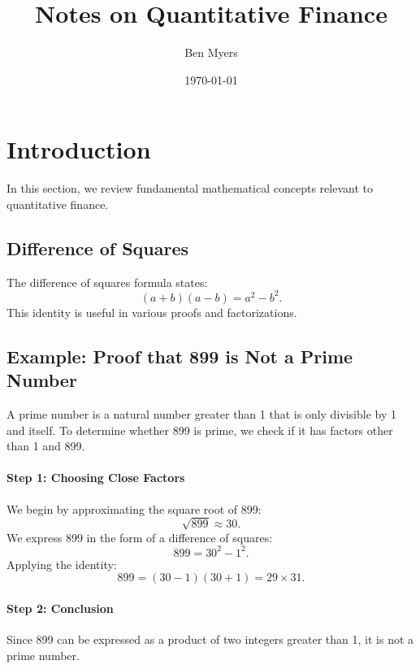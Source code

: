 \documentclass{article}
\title{Notes on Quantitative Finance}
\author{Ben Myers}
\date{\today}
\begin{document}
\maketitle 

\section{Introduction}

In this section, we review fundamental mathematical concepts relevant to quantitative finance.

\subsection{Difference of Squares}
The difference of squares formula states:
\begin{equation}
    (a+b)(a-b) = a^2 - b^2.
\end{equation}
This identity is useful in various proofs and factorizations.

\subsection{Example: Proof that 899 is Not a Prime Number}

A prime number is a natural number greater than 1 that is only divisible by 1 and itself. To determine whether 899 is prime, we check if it has factors other than 1 and 899.

\paragraph{Step 1: Choosing Close Factors}  
We begin by approximating the square root of 899:
\[
\sqrt{899} \approx 30.
\]
We express 899 in the form of a difference of squares:
\[
899 = 30^2 - 1^2.
\]
Applying the identity:
\[
899 = (30 - 1)(30 + 1) = 29 \times 31.
\]

\paragraph{Step 2: Conclusion}  
Since 899 can be expressed as a product of two integers greater than 1, it is not a prime number.
\end{document}
